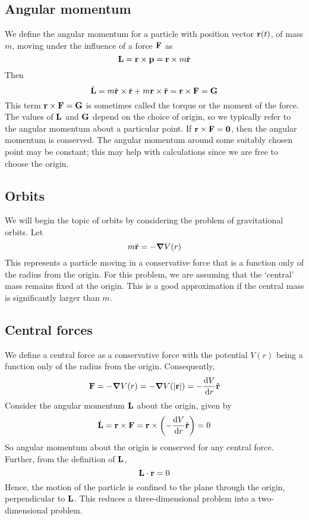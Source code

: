 \subsection{Angular momentum}
We define the angular momentum for a particle with position vector \(\vb r(t)\), of mass \(m\), moving under the influence of a force \(\vb F\) as
\[
	\vb L = \vb r \times \vb p = \vb r \times m \dot{\vb r}
\]
Then
\[
	\dot{\vb L} = m\dot{\vb r} \times \dot{\vb r} + m\vb r \times \ddot{\vb r} = \vb r \times \vb F = \vb G
\]
This term \(\vb r \times \vb F = \vb G\) is sometimes called the torque or the moment of the force.
The values of \(\vb L\) and \(\vb G\) depend on the choice of origin, so we typically refer to the angular momentum about a particular point.
If \(\vb r \times \vb F = \vb 0\), then the angular momentum is conserved.
The angular momentum around some suitably chosen point may be constant; this may help with calculations since we are free to choose the origin.

\subsection{Orbits}
We will begin the topic of orbits by considering the problem of gravitational orbits.
Let
\[
	m\ddot{\vb r} = -\grad V(r)
\]
This represents a particle moving in a conservative force that is a function only of the radius from the origin.
For this problem, we are assuming that the `central' mass remains fixed at the origin.
This is a good approximation if the central mass is significantly larger than \(m\).

\subsection{Central forces}
We define a central force as a conservative force with the potential \(V(r)\) being a function only of the radius from the origin.
Consequently,
\[
	\vb F = -\grad V(r) = -\grad V(\abs{\vb r}) = -\frac{\dd{V}}{\dd{r}}\hat{\vb{r}}
\]
Consider the angular momentum \(\vb L\) about the origin, given by
\[
	\dot{\vb L} = \vb r \times \vb F = \vb r \times \left(-\frac{\dd{V}}{\dd{r}}\hat{\vb{r}}\right) = 0
\]
So angular momentum about the origin is conserved for any central force.
Further, from the definition of \(\vb L\),
\[
	\vb L \cdot \vb r = 0
\]
Hence, the motion of the particle is confined to the plane through the origin, perpendicular to \(\vb L\).
This reduces a three-dimensional problem into a two-dimensional problem.

